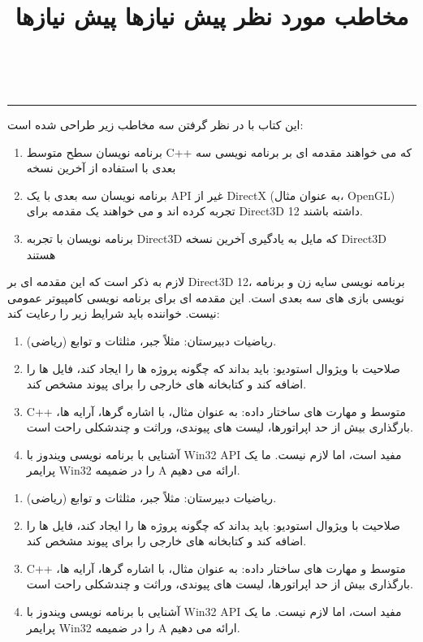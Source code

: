 \documentclass[oneside]{book}
\begin{document}
    \title{
        \LARGE
        مخاطب مورد نظر
    }
    \\ \rule{\textwidth}{0.5pt}
    {این کتاب با در نظر گرفتن سه مخاطب زیر طراحی شده است:}
    \begin{enumerate}
        \item {برنامه نویسان سطح متوسط C++ که می خواهند مقدمه ای بر برنامه نویسی سه بعدی با استفاده از آخرین نسخه}
        \item {برنامه نویسان سه بعدی با یک API غیر از DirectX (به عنوان مثال، OpenGL) تجربه کرده اند و می خواهند یک مقدمه برای Direct3D 12 داشته باشند.}
        \item {برنامه نویسان با تجربه Direct3D که مایل به یادگیری آخرین نسخه Direct3D هستند}
    \end{enumerate}

    \title{
        \LARGE
        پیش نیازها
    }
    {لازم به ذکر است که این مقدمه ای بر Direct3D 12، برنامه نویسی سایه زن و برنامه نویسی بازی های سه بعدی است. این مقدمه ای برای برنامه نویسی کامپیوتر عمومی نیست. خواننده باید شرایط زیر را رعایت کند:}

    \begin{enumerate}
        \item {ریاضیات دبیرستان: مثلاً جبر، مثلثات و توابع (ریاضی).}
        \item {صلاحیت با ویژوال استودیو: باید بداند که چگونه پروژه ها را ایجاد کند، فایل ها را اضافه کند و کتابخانه های خارجی را برای پیوند مشخص کند.}
        \item {C++ متوسط ​​و مهارت های ساختار داده: به عنوان مثال، با اشاره گرها، آرایه ها، بارگذاری بیش از حد اپراتورها، لیست های پیوندی، وراثت و چندشکلی راحت است.}
        \item {آشنایی با برنامه نویسی ویندوز با Win32 API مفید است، اما لازم نیست. ما یک پرایمر Win32 را در ضمیمه A ارائه می دهیم.}
    \end{enumerate}

    \title{
        \LARGE
        پیش نیازها
    }
    {}
    \begin{enumerate}
        \item {ریاضیات دبیرستان: مثلاً جبر، مثلثات و توابع (ریاضی).}
        \item {صلاحیت با ویژوال استودیو: باید بداند که چگونه پروژه ها را ایجاد کند، فایل ها را اضافه کند و کتابخانه های خارجی را برای پیوند مشخص کند.}
        \item {C++ متوسط ​​و مهارت های ساختار داده: به عنوان مثال، با اشاره گرها، آرایه ها، بارگذاری بیش از حد اپراتورها، لیست های پیوندی، وراثت و چندشکلی راحت است.}
        \item {آشنایی با برنامه نویسی ویندوز با Win32 API مفید است، اما لازم نیست. ما یک پرایمر Win32 را در ضمیمه A ارائه می دهیم.}
    \end{enumerate}

    \newpage


    

    \begin{latin}
        
        
    \end{latin}
\end{document}
